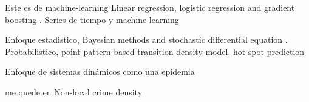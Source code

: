 \documentclass[onecolumn,12pt,letterpaper]{article}
\begin{document}
Este es de machine-learning \cite{alves_crime_2018}
Linear regression, logistic regression and gradient boosting \cite{ingilevich_crime_2018}. Series de tiempo y machine learning \cite{wang_learning_2013}


Enfoque estadistico\cite{noauthor_bayesian_nodate}, Bayesian methods and stochastic differential equation \cite{mohler_geographic_2012}. Probabilistico, point-pattern-based transition density model. hot spot prediction\cite{liu_criminal_2003} 

Enfoque de sistemas dinámicos como una epidemia \cite{gonzalez-parra_mathematical_2018} \cite{srivastav_modeling_2019} \cite{mcmillon_modeling_2014}

me quede en Non-local crime density




\end{document}
